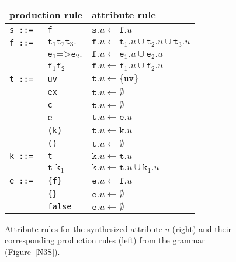 \begin{figure}
\centering
\small
\begin{tabular}{lll}
\hline
\multicolumn{2}{l}{production rule}\hspace{0.2\textwidth} & attribute rule\\
  \hline
\texttt{s ::=}&\texttt{f}& $\texttt{s}.u \leftarrow \texttt{f}.u$\\
\texttt{f ::= } &  $ \texttt{t}_1 \texttt{t}_2 \texttt{t}_3.$&   $ \texttt{f}.u \leftarrow \texttt{t}_1.u \cup \texttt{t}_2.u \cup \texttt{t}_3.u$ \\
    &  $\texttt{e}_1 \texttt{=>}  \texttt{e}_2.$& $\texttt{f}.u \leftarrow \texttt{e}_1.u \cup \texttt{e}_2.u$ \\
    & $ \texttt{f}_1 \texttt{f}_2$ &                $\texttt{f}.u \leftarrow \texttt{f}_1.u\cup \texttt{f}_2.u$ \\
\texttt{t ::=}& \texttt{uv}\hspace{0.07\textwidth} &                $\texttt{t}.u \leftarrow\{\texttt{uv}\}$\\
            & \texttt{ex} &               $\texttt{t}.u \leftarrow \emptyset$\\
      & \texttt{c} &               $\texttt{t}.u \leftarrow\emptyset$\\
      & \texttt{e} &                $\texttt{t}.u \leftarrow\texttt{e}.u $\\
      & \texttt{(k)}& $\texttt{t}.u \leftarrow\texttt{k}.u$\\
      & \texttt{()}& $\texttt{t}.u \leftarrow\emptyset$\\
\texttt{k ::=}& \texttt{t}& $\texttt{k}.u \leftarrow\texttt{t}.u$\\
&$\texttt{t k}_1$ & $\texttt{k}.u \leftarrow\texttt{t}.u\cup\texttt{k}_1.u$\\
\texttt{e ::=}&\texttt{\{f\}} &                $\texttt{e}.u \leftarrow\texttt{f}.u$\\
       &\texttt{\{\}} &  $\texttt{e}.u \leftarrow\emptyset$\\
       &\texttt{false}       &                $\texttt{e}.u \leftarrow\emptyset$\\
  \hline
\end{tabular}
\normalsize
\caption{Attribute rules for the synthesized attribute $u$ (right) and their corresponding production rules (left) from the \nthree grammar (Figure~\ref{N3S}).\label{EYEAT}}
\end{figure}
